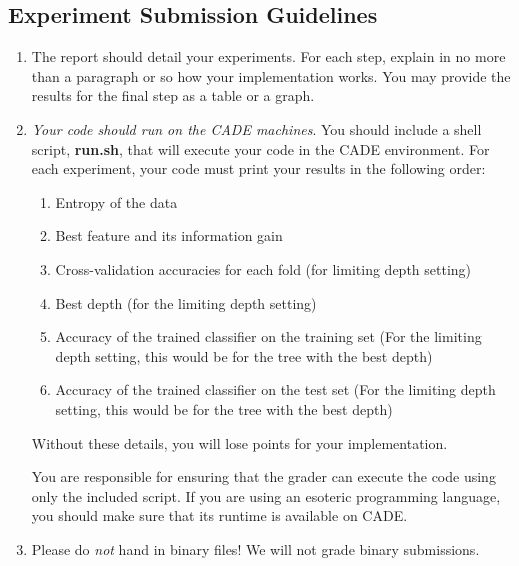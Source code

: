 \subsection*{Experiment Submission Guidelines}
\begin{enumerate}
\item The report should detail your experiments. For each step, explain in no
  more than a paragraph or so how your implementation works. You may provide the
  results for the final step as a table or a graph.
\item \textit{Your code should run on the CADE machines}. You should include a
  shell script, \textbf{run.sh}, that will execute your code in the CADE
  environment. For each experiment, your code must print your results in the
  following order:
  \begin{enumerate}
  \item Entropy of the data
  \item Best feature and its information gain
  \item Cross-validation accuracies for each fold (for limiting depth setting)
  \item Best depth (for the limiting depth setting)
  \item Accuracy of the trained classifier on the training set (For the limiting
    depth setting, this would be for the tree with the best depth)
  \item Accuracy of the trained classifier on the test set (For the limiting
    depth setting, this would be for the tree with the best depth)
  \end{enumerate}

  Without these details, you will lose points for your implementation.
  
  You are responsible for ensuring that the grader can execute the code using
  only the included script. If you are using an esoteric programming language,
  you should make sure that its runtime is available on CADE.
\item Please do \textit{not} hand in binary files! We will not grade binary
  submissions.
\end{enumerate}


